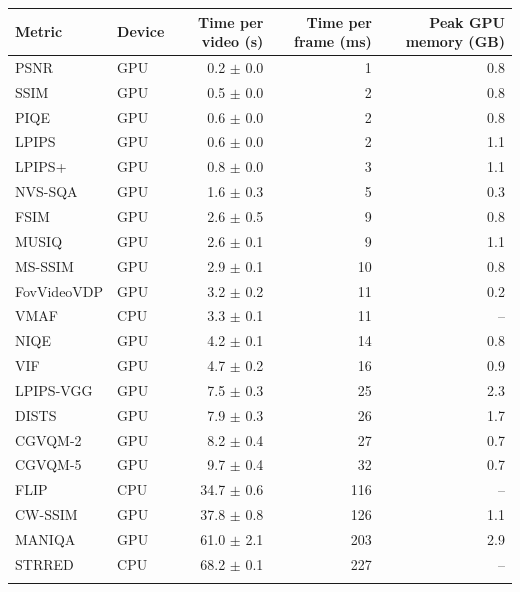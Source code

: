 \begin{tabular}{@{}llrrr@{}}
\toprule
Metric & Device & Time per video (s) & Time per frame (ms) & Peak GPU memory (GB) \\
\midrule
PSNR & GPU & 0.2 $\pm$ 0.0 & 1 & 0.8 \\
SSIM & GPU & 0.5 $\pm$ 0.0 & 2 & 0.8 \\
PIQE & GPU & 0.6 $\pm$ 0.0 & 2 & 0.8 \\
LPIPS & GPU & 0.6 $\pm$ 0.0 & 2 & 1.1 \\
LPIPS+ & GPU & 0.8 $\pm$ 0.0 & 3 & 1.1 \\
NVS-SQA & GPU & 1.6 $\pm$ 0.3 & 5 & 0.3 \\
FSIM & GPU & 2.6 $\pm$ 0.5 & 9 & 0.8 \\
MUSIQ & GPU & 2.6 $\pm$ 0.1 & 9 & 1.1 \\
MS-SSIM & GPU & 2.9 $\pm$ 0.1 & 10 & 0.8 \\
FovVideoVDP & GPU & 3.2 $\pm$ 0.2 & 11 & 0.2 \\
VMAF & CPU & 3.3 $\pm$ 0.1 & 11 & -- \\
NIQE & GPU & 4.2 $\pm$ 0.1 & 14 & 0.8 \\
VIF & GPU & 4.7 $\pm$ 0.2 & 16 & 0.9 \\
LPIPS-VGG & GPU & 7.5 $\pm$ 0.3 & 25 & 2.3 \\
DISTS & GPU & 7.9 $\pm$ 0.3 & 26 & 1.7 \\
CGVQM-2 & GPU & 8.2 $\pm$ 0.4 & 27 & 0.7 \\
CGVQM-5 & GPU & 9.7 $\pm$ 0.4 & 32 & 0.7 \\
FLIP & CPU & 34.7 $\pm$ 0.6 & 116 & -- \\
CW-SSIM & GPU & 37.8 $\pm$ 0.8 & 126 & 1.1 \\
MANIQA & GPU & 61.0 $\pm$ 2.1 & 203 & 2.9 \\
STRRED & CPU & 68.2 $\pm$ 0.1 & 227 & -- \\
\botrule
\end{tabular}
